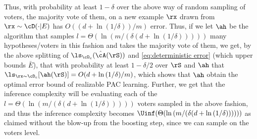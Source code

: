 Thus, with probability at least $ 1-\delta $ over the above way of random sampling of voters, the majority vote of them, on a new example $ \rx $ drawn from $ \rx\sim\cD(\cdot|E) $ has $O((d+\ln{\left(1/\delta \right)})/m)$ error. Thus, if we let $ \ah $ be the algorithm that samples $l= \Theta(\ln{\left(m/(\delta(d+\ln{\left(1/\delta \right)})) \right)} )$ many hypotheses/voters in this fashion and takes the majority vote of them, we get, by the above splitting of $ \ls_{\cD_{c}}(\hat{\cA}(\rS)) $  and \cref{eq:deterministic error} (which upper bounds $\bar{E}$),  that with probability at least $ 1-\delta/2 $ over $ \rS $ and $ \ah $  that    $\ls_{\rx\sim\cD_{c}}[\ah(\rS) ] =O(d+\ln{\left(1/\delta \right)}/m)$, which shows that $ \ah $ obtain the optimal error bound of realizable PAC learning. Further, we get that the inference complexity will be evaluating each of the  $l= \Theta(\ln{\left(m/(\delta(d+\ln{\left(1/\delta \right)})) \right)} )$ voters sampled in the above fashion, and thus the inference complexity becomes $ \Uinf(\Theta(\ln{\left(m/(\delta(d+\ln{\left(1/\delta \right)})) \right)}))$ as claimed without the blow-up from the boosting step, since we can sample on the voters level.  


